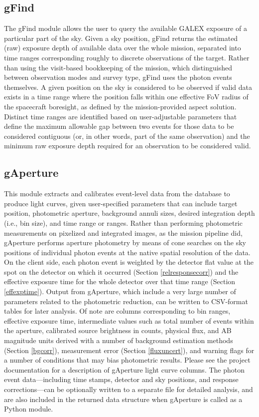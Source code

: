 \documentclass[preprint]{aastex}
\begin{document}
\subsection{gFind}
\label{gfind}
The gFind module allows the user to query the available GALEX exposure of a particular part of the sky. Given a sky position, gFind returns the estimated (raw) exposure depth of available data over the whole mission, separated into time ranges corresponding roughly to discrete observations of the target. Rather than using the visit-based bookkeeping of the mission, which distinguished between observation modes and survey type, gFind uses the photon events themselves. A given position on the sky is considered to be observed if valid data exists in a time range where the position falls within one effective FoV radius of the spacecraft boresight, as defined by the mission-provided aspect solution. Distinct time ranges are identified based on user-adjustable parameters that define the maximum allowable gap between two events for those data to be considered contiguous (or, in other words, part of the same observation) and the minimum raw exposure depth required for an observation to be considered valid.

\subsection{gAperture}
This module extracts and calibrates event-level data from the database to produce light curves, given user-specified parameters that can include target position, photometric aperture, background annuli sizes, desired integration depth (i.e., bin size), and time range or ranges. Rather than performing photometric measurements on pixelized and integrated images, as the mission pipeline did, gAperture performs aperture photometry by means of cone searches on the sky positions of individual photon events at the native spatial resolution of the data. On the client side, each photon event is weighted by the detector flat value at the spot on the detector on which it occurred (Section \ref{relresponsecorr}) and the effective exposure time for the whole detector over that time range (Section \ref{effexptime}). Output from gAperture, which include a very large number of parameters related to the photometric reduction, can be written to CSV-format tables for later analysis. Of note are columns corresponding to bin ranges, effective exposure time, intermediate values such as total number of events within the aperture, calibrated source brightness in counts, physical flux, and AB magnitude units derived with a number of background estimation methods (Section \ref{bgcorr}), measurement error (Section \ref{fluxuncert}), and warning flags for a number of conditions that may bias photometric results. Please see the project documentation for a description of gAperture light curve columns. The photon event data---including time stamps, detector and sky positions, and response corrections---can be optionally written to a separate file for detailed analysis, and are also included in the returned data structure when gAperture is called as a Python module.
\end{document}
